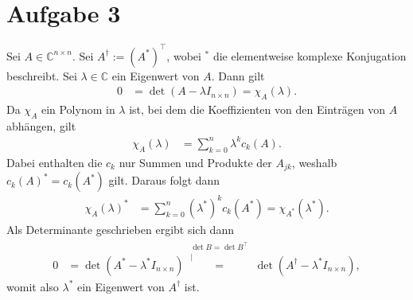 \documentclass[english, parskip=full]{scrartcl}
\newcommand{\kom}{}
\newcommand{\kla}{}
\begin{document}
%
%


\section*{Aufgabe 3}
Sei $A\in\mathbb{C}^{n\times n}$.
Sei $A^\dagger := (A^\ast)^\top$, wobei ${}^\ast$ die elementweise komplexe Konjugation beschreibt.
Sei $\lambda\in\mathbb{C}$ ein Eigenwert von $A$.
Dann gilt
\begin{align}
0 &= \det \kla\left( A - \lambda I_{n\times n} \right) = \chi_A(\lambda).
\end{align}
Da $\chi_A$ ein Polynom in $\lambda$ ist, bei dem die Koeffizienten von den Einträgen von $A$ abhängen, gilt 
\begin{align}
\chi_A(\lambda) &= \sum_{k=0}^n \lambda^k c_k(A).
\end{align}
Dabei enthalten die $c_k$ nur Summen und Produkte der $A_{jk}$, weshalb $c_k(A)^\ast = c_k(A^\ast)$ gilt.
Daraus folgt dann
\begin{align}
\chi_A(\lambda)^\ast &= \sum_{k=0}^n \kla\left( \lambda^\ast \right)^k c_k(A^\ast) = \chi_{A^\ast}(\lambda^\ast).
\end{align}
Als Determinante geschrieben ergibt sich dann
\begin{align}
0 &= \det\kla\left( A^\ast - \lambda^\ast I_{n\times n} \right) \kom\overset{\substack{{\det B = \det B^\top} \\ |}}{=} \det\kla\left( A^\dagger - \lambda^\ast I_{n\times n} \right),
\end{align}
womit also $\lambda^\ast$ ein Eigenwert von $A^\dagger$ ist.
\end{document}
